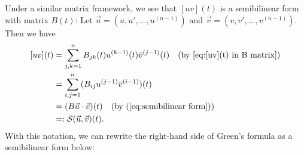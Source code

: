 \documentclass[11pt, oneside, a4paper]{article}
\begin{document}
Under a similar matrix framework, we see that $[uv](t)$ is a semibilinear form with matrix $B(t)$: Let $\vec{u}=(u, u', \ldots, u^{(n-1)})$ and $\vec{v}=(v, v', \ldots, v^{(n-1)})$. Then we have
\begin{equation}\label{[uv](t) in semibilinear form}
    \begin{split}
    [uv](t) &= \sum_{j,k=1}^n B_{jk}(t)u^{(k-1)}(t)\bar{v}^{(j-1)}(t)\quad\mbox{(by \eqref{eq:[uv](t) in B matrix})}\\
    &= \sum_{i,j=1}^n (B_{ij}u^{(j-1)}\overline{v}^{(i-1)})(t)\\
    &= (B\vec{u}\cdot \vec{v})(t)\quad\mbox{(by (\ref{eq:semibilinear form}))}\\
    &=: \mathcal{S}(\vec{u},\vec{v})(t).
    \end{split}
\end{equation}
With this notation, we can rewrite the right-hand side of Green's formula as a semibilinear form below:
\end{document}
